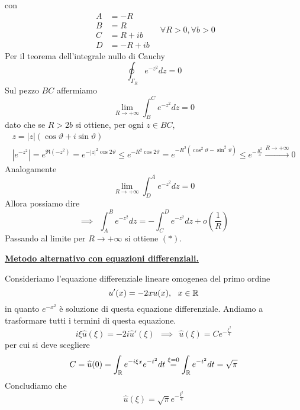 con
\begin{equation*}
\begin{aligned}
A & =-R\\
B & =R\\
C & =R+ib\\
D & =-R+ib
\end{aligned} \ \ \ \ \forall R >0,\forall b >0
\end{equation*}
Per il teorema dell'integrale nullo di Cauchy
\begin{equation*}
\oint _{\Gamma _{R}} e^{-z^{2}} dz=0
\end{equation*}
Sul pezzo $BC$ affermiamo
\begin{equation*}
\lim\limits _{R\rightarrow +\infty }\int ^{C}_{B} e^{-z^{2}} dz=0
\end{equation*}
dato che se $R >2b$ si ottiene, per ogni $z\in BC$,
\begin{gather*}
z=| z| (\cos \vartheta +i\sin \vartheta )\\
\left| e^{-z^{2}}\right| =e^{\Re \left( -z^{2}\right)} =e^{-| z| ^{2}\cos 2\vartheta } \leqslant e^{-R^{2}\cos 2\vartheta } =e^{-R^{2}\left(\cos^{2} \vartheta -\sin^{2} \vartheta \right)} \leqslant e^{-\frac{R^{2}}{4}}\xrightarrow{R\rightarrow +\infty } 0
\end{gather*}
Analogamente
\begin{equation*}
\lim\limits _{R\rightarrow +\infty }\int ^{A}_{D} e^{-z^{2}} dz=0
\end{equation*}
Allora possiamo dire
\begin{equation*}
\implies \ \ \int ^{B}_{A} e^{-z^{2}} dz=-\int ^{D}_{C} e^{-z^{2}} dz+o\left(\frac{1}{R}\right)
\end{equation*}
Passando al limite per $R\rightarrow +\infty $ si ottiene $( *)$.



\underline{\textbf{Metodo alternativo con equazioni differenziali.}}

Consideriamo l'equazione differenziale lineare omogenea del primo ordine
\begin{equation*}
u'( x) =-2xu( x) ,\ \ x\in \mathbb{R} 
\end{equation*}
in quanto $e^{-x^{2}}$ è soluzione di questa equazione differenziale. Andiamo a trasformare tutti i termini di questa equazione.
\begin{equation*}
i\xi \hat{u}( \xi ) =-2i\hat{u} '( \xi ) \ \ \implies \ \ \hat{u}( \xi ) =Ce^{-\frac{\xi ^{2}}{4}}
\end{equation*}
per cui si deve scegliere
\begin{equation*}
C=\widehat{u}( 0) =\int _{\mathbb{R} } e^{-i\xi x} e^{-t^{2}} dt\overset{\xi =0}{=}\int _{\mathbb{R} } e^{-t^{2}} dt=\sqrt{\pi }
\end{equation*}
Concludiamo che
\begin{equation*}
\boxed{\hat{u}( \xi ) =\sqrt{\pi } e^{-\frac{\xi ^{2}}{4}}}
\end{equation*}
\Soluzione

